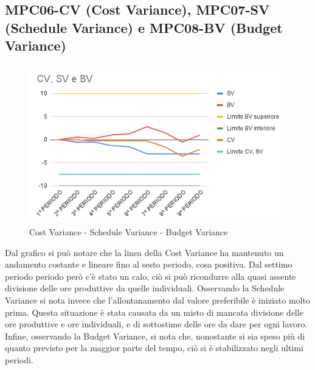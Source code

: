\subsection{MPC06-CV (Cost Variance), MPC07-SV (Schedule Variance) e MPC08-BV (Budget Variance)}
\begin{figure}[H]
  \centering
  \includegraphics[width=0.7\linewidth]{grafici/CV_SV_BV.png}
  \caption{Cost Variance - Schedule Variance - Budget Variance}
\end{figure}
Dal grafico si può notare che la linea della Cost Variance ha mantenuto un andamento costante e lineare fino al sesto periodo, cosa positiva. Dal settimo periodo periodo però c'è stato un calo, ciò si può ricondurre alla quasi assente divisione delle ore produttive da quelle individuali. Osservando la Schedule Variance si nota invece che l'allontanamento dal valore preferibile è iniziato molto prima. Questa situazione è stata causata da un misto di mancata divisione delle ore produttive e ore individuali, e di sottostime delle ore da dare per ogni lavoro. Infine, osservando la Budget Variance, si nota che, nonostante si sia speso più di quanto previsto per la maggior parte del tempo, ciò si è stabilizzato negli ultimi periodi.
